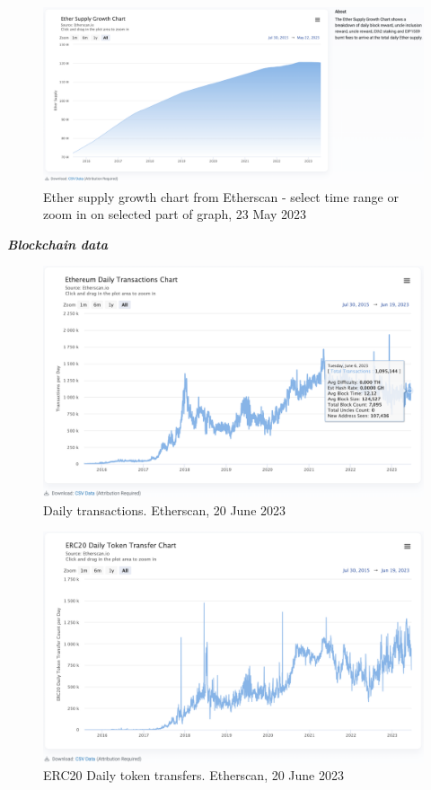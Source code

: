 \documentclass[UTF8]{article}
\begin{document}
{\begin{figure}[htbp]
\begin{center}
\includegraphics[width=0.9\linewidth]{images/ethgrowth}
\caption{Ether supply growth chart from Etherscan - select time range or zoom in on selected part of graph, 23 May 2023}
\label{fig:ethgrowth}
\end{center}
\end{figure}

\clearpage

\textit{\textbf{Blockchain data}}
\begin{figure}[htbp]
\begin{center}
\includegraphics[width=0.9\linewidth]{images/ethdailytxns}
\caption{Daily transactions. Etherscan, 20 June 2023}
\label{fig:ethdailytxns}
\end{center}
\end{figure}

\begin{figure}[htbp]
\begin{center}
\includegraphics[width=0.9\linewidth]{images/ethdailyerc20}
\caption{ERC20 Daily token transfers. Etherscan, 20 June 2023}
\label{fig:ethdailyerc20}
\end{center}
\end{figure}

}
\end{document}
